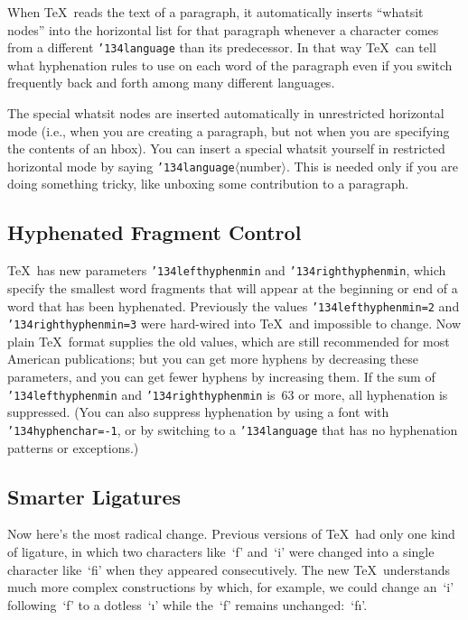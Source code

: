 When \TeX\ reads the text of a paragraph, it automatically inserts
``whatsit nodes'' into the horizontal list for that paragraph whenever
a character comes from  a different
{\tt{\char'134}language}
than its predecessor. In that way \TeX\ can tell what hyphenation
rules to use on each word of the paragraph even if you switch 
frequently back and forth among many different languages.

The special whatsit nodes are inserted automatically in unrestricted horizontal
mode (i.e.,  when you are creating a paragraph, but not when you are
specifying the contents of an hbox). You can insert a special whatsit
yourself in restricted horizontal mode by saying
{\tt{\char'134}language}$\langle$number$\rangle$.
This is needed only if you are doing something tricky, like unboxing some
contribution to a paragraph.

\subsection{Hyphenated Fragment Control}

\TeX\ has new parameters 
{\tt{\char'134}lefthyphenmin}
and
{\tt{\char'134}righthyphenmin},
which specify the smallest word fragments that will appear at the beginning
or end of a word that has been hyphenated. Previously the values
{\tt{\char'134}lefthyphenmin=2}
and
{\tt{\char'134}righthyphenmin=3}
were hard-wired into \TeX\ and impossible to change. Now plain \TeX\
format supplies the old values, which are still recommended for most
American publications; but you can get more hyphens by decreasing these
parameters, and you can get fewer hyphens by increasing them. If the sum of
{\tt{\char'134}lefthyphenmin}
and
{\tt{\char'134}righthyphenmin}
is~63 or more, all hyphenation is suppressed. (You can also suppress 
hyphenation by using a font with
{\tt{\char'134}hyphenchar=-1},
or by switching to a 
{\tt{\char'134}language}
that has no hyphenation patterns or exceptions.)

\subsection{Smarter Ligatures}

Now here's the most radical change.
Previous versions of \TeX\ had only one kind of ligature, in which two
characters like~`f' and~`i' were changed into a single character like~`fi'
when they appeared consecutively. The new \TeX\ understands much more
complex constructions by which, for example, we could change
an~`i' following~`f' to a dotless~`\i' while the~`f' remains
 unchanged:~`f\i'.

